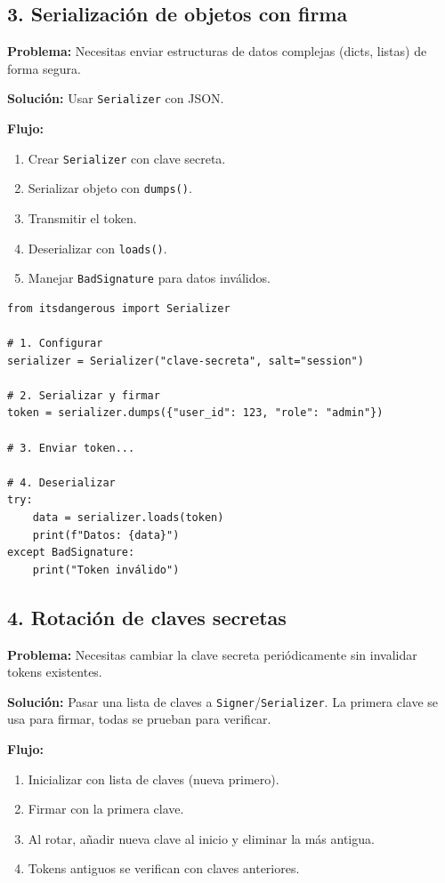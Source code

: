 \documentclass[11pt,a4paper]{article}
\begin{document}
\subsection*{3. Serialización de objetos con firma}


\textbf{Problema:} Necesitas enviar estructuras de datos complejas (dicts, listas) de forma segura.


\textbf{Solución:} Usar \texttt{Serializer} con JSON.


\textbf{Flujo:}


\begin{enumerate}[leftmargin=*,topsep=2pt,itemsep=1pt]
  \item Crear \texttt{Serializer} con clave secreta.
  \item Serializar objeto con \texttt{dumps()}.
  \item Transmitir el token.
  \item Deserializar con \texttt{loads()}.
  \item Manejar \texttt{BadSignature} para datos inválidos.
\end{enumerate}


\begin{lstlisting}
from itsdangerous import Serializer

# 1. Configurar
serializer = Serializer("clave-secreta", salt="session")

# 2. Serializar y firmar
token = serializer.dumps({"user_id": 123, "role": "admin"})

# 3. Enviar token...

# 4. Deserializar
try:
    data = serializer.loads(token)
    print(f"Datos: {data}")
except BadSignature:
    print("Token inválido")
\end{lstlisting}


\subsection*{4. Rotación de claves secretas}


\textbf{Problema:} Necesitas cambiar la clave secreta periódicamente sin invalidar tokens existentes.


\textbf{Solución:} Pasar una lista de claves a \texttt{Signer}/\texttt{Serializer}. La primera clave se usa para firmar, todas se prueban para verificar.


\textbf{Flujo:}


\begin{enumerate}[leftmargin=*,topsep=2pt,itemsep=1pt]
  \item Inicializar con lista de claves (nueva primero).
  \item Firmar con la primera clave.
  \item Al rotar, añadir nueva clave al inicio y eliminar la más antigua.
  \item Tokens antiguos se verifican con claves anteriores.
\end{enumerate}
\end{document}
